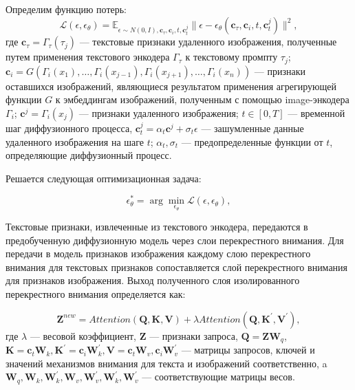 \documentclass{article}
\begin{document}
Определим функцию потерь: 
\begin{equation}
\mathcal{L}(\epsilon, \epsilon_{\theta}) = \mathbb{E}_{\epsilon \sim N(0, I),\mathbf{c}_{\tau}, \mathbf{c}_{i}, t, \mathbf{c}^{j}_{t}} \|\epsilon - \epsilon_{\theta}(\mathbf{c}_{\tau}, \mathbf{c}_{i}, t, \mathbf{c}^{j}_{t})\|^2,
\end{equation}
где $\mathbf{c}_{\tau} = \Gamma_\tau(\tau_j)$ --- текстовые признаки удаленного изображения, полученные путем применения текстового энкодера $\Gamma_\tau$ к текстовому промпту $\tau_j$; $\mathbf{c}_{i} = G(\Gamma_i(x_1), \dots, \Gamma_i(x_{j-1}), \Gamma_i(x_{j+1}), \dots, \Gamma_i(x_n))$ --- признаки оставшихся изображений, являющиеся результатом применения агрегирующей функции $G$ к эмбеддингам изображений, полученным с помощью image-энкодера $\Gamma_i$; $\mathbf{c}^{j} = \Gamma_i(x_j)$ --- признаки удаленного изображения; $t \in [0, T]$ --- временной шаг диффузионного процесса, $\mathbf{c}^{j}_{t} = \alpha_t \mathbf{c}^{j}  + \sigma_t \epsilon$ --- зашумленные данные удаленного изображения на шаге $t$; $\alpha_t, \sigma_t$ --- предопределенные функции от $t$, определяющие диффузионный процесс.

Решается следующая оптимизационная задача:

\begin{equation}
\epsilon_{\theta}^* = \arg \min_{\epsilon_{\theta}}\mathcal{L}(\epsilon, \epsilon_{\theta}),
\end{equation}

Текстовые признаки, извлеченные из текстового энкодера, передаются в предобученную диффузионную модель через слои перекрестного внимания. Для передачи в модель признаков изображения каждому слою перекрестного внимания для текстовых признаков сопоставляется слой перекрестного внимания для признаков изображения. Выход полученного слоя изолированного перекрестного внимания определяется как:

\begin{equation}
\mathbf{Z}^{new} = Attention(\mathbf{Q}, \mathbf{K}, \mathbf{V}) + \lambda Attention(\mathbf{Q}, \mathbf{K}^{\prime}, \mathbf{V}^{\prime}), 
\end{equation}
где $\lambda$ --- весовой коэффициент, $\mathbf{Z}$ --- признаки запроса, $\mathbf{Q} = \mathbf{Z}\mathbf{W}_q$, $\mathbf{K} = \mathbf{c}_t\mathbf{W}_k, \mathbf{K}^{\prime} = \mathbf{c}_i {\mathbf{W}}^{\prime}_{k}, \mathbf{V} = \mathbf{c}_t\mathbf{W}_{v}, \mathbf{c}_i {\mathbf{W}}^{\prime}_{v}$ --- матрицы запросов, ключей и значений механизмов внимания для текста и изображений соответственно, a $\mathbf{W}_q, \mathbf{W}_k, {\mathbf{W}}^{\prime}_{k}, \mathbf{W}_v, {\mathbf{W}}^{\prime}_{v}, {\mathbf{W}}^{\prime}_k,{\mathbf{W}}^{\prime}_v$ --- соответствующие матрицы весов. 
\end{document}
